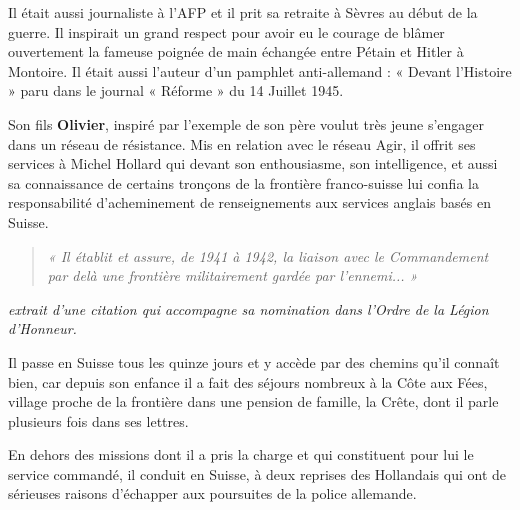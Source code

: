 Il était aussi journaliste à l’AFP et il prit sa retraite à Sèvres au début de la guerre. Il inspirait
un grand respect pour avoir eu le courage de blâmer ouvertement la fameuse poignée de main
échangée entre Pétain et Hitler à Montoire. Il était aussi l’auteur d’un pamphlet anti-allemand :
« Devant l’Histoire » paru dans le journal « Réforme » du 14 Juillet 1945.

Son fils \textbf{Olivier}, inspiré par l’exemple de son père voulut très jeune s’engager dans un réseau
de résistance. Mis en relation avec le réseau Agir, il offrit ses services à Michel Hollard qui
devant son enthousiasme, son intelligence, et aussi sa connaissance de certains tronçons de la
frontière franco-suisse lui confia la responsabilité d’acheminement de renseignements aux
services anglais basés en Suisse.

\begin{quote}\itshape
« Il établit et assure, de 1941 à 1942, la liaison avec le Commandement par delà une frontière militairement
gardée par l’ennemi... »
\end{quote}

\noindent\textit{extrait d’une citation qui accompagne sa nomination dans l’Ordre de la Légion d’Honneur.}

Il passe en Suisse tous les quinze jours et y accède par des chemins qu’il connaît bien, car
depuis son enfance il a fait des séjours nombreux à la Côte aux Fées, village proche de la
frontière dans une pension de famille, la Crête, dont il parle plusieurs fois dans ses lettres.

En dehors des missions dont il a pris la charge et qui constituent pour lui le service commandé,
il conduit en Suisse, à deux reprises des Hollandais qui ont de sérieuses raisons d’échapper
aux poursuites de la police allemande.
